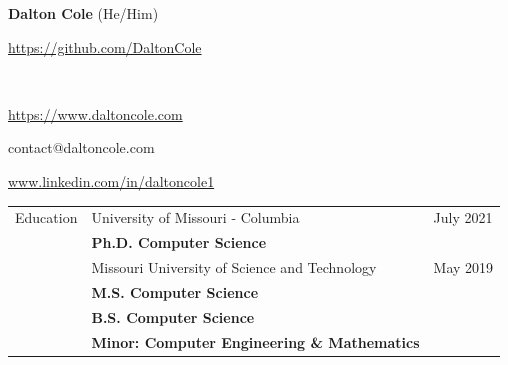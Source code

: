 \documentclass[10pt]{article}
\newcommand{\headercell}[1]{\parbox{.333\textwidth}{#1}}
\newcommand{\headerline}[3]{%
  \noindent\headercell{#1 \hfill} \headercell{\hfil #2 \hfil} \headercell{\hfill #3}%
}
\newenvironment{entries}{\begin{tabular}{p{1.5cm} p{13.2cm} l}}{\end{tabular}}
\begin{document}


\headerline{}{\textbf{Dalton Cole} (He/Him)}{\url{https://github.com/DaltonCole}} \\
\headerline{\url{https://www.daltoncole.com}}{contact@daltoncole.com}{\url{www.linkedin.com/in/daltoncole1}}
\noindent\makebox[\linewidth]{\rule{\textwidth}{.4pt}}


\begin{entries}
Education & University of Missouri - Columbia & July 2021 \\
          & \textbf{Ph.D. Computer Science} \\
          & Missouri University of Science and Technology & May 2019 \\
          & \textbf{M.S. Computer Science} \\
          & \textbf{B.S. Computer Science} \\
          & \textbf{Minor: Computer Engineering \& Mathematics} \\
\end{entries}

\end{document}
